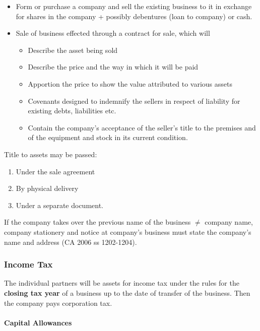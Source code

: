 \documentclass[
]{article}
\providecommand{\tightlist}{%
  \setlength{\itemsep}{0pt}\setlength{\parskip}{0pt}}
\begin{document}
\begin{itemize}
\tightlist
\item
  Form or purchase a company and sell the existing business to it in
  exchange for shares in the company + possibly debentures (loan to
  company) or cash.
\item
  Sale of business effected through a contract for sale, which will

  \begin{itemize}
  \tightlist
  \item
    Describe the asset being sold
  \item
    Describe the price and the way in which it will be paid
  \item
    Apportion the price to show the value attributed to various assets
  \item
    Covenants designed to indemnify the sellers in respect of liability
    for existing debts, liabilities etc.
  \item
    Contain the company's acceptance of the seller's title to the
    premises and of the equipment and stock in its current condition.
  \end{itemize}
\end{itemize}

Title to assets may be passed:

\begin{enumerate}
\tightlist
\item
  Under the sale agreement
\item
  By physical delivery
\item
  Under a separate document.
\end{enumerate}

If the company takes over the previous name of the business {\(\neq\)}
company name, company stationery and notice at company's business must
state the company's name and address (CA 2006 ss 1202-1204).

\hypertarget{income-tax}{%
\subsubsection{Income Tax}\label{income-tax}}

The individual partners will be assets for income tax under the rules
for the \textbf{closing tax year} of a business up to the date of
transfer of the business. Then the company pays corporation tax.

\hypertarget{capital-allowances}{%
\paragraph{Capital Allowances}\label{capital-allowances}}
\end{document}
